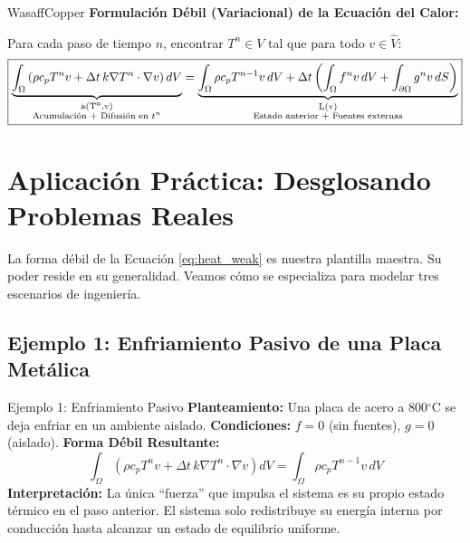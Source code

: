 \documentclass[11pt, a4paper]{article}
\begin{document}
\begin{keybox}{WasaffCopper}
    \textbf{Formulación Débil (Variacional) de la Ecuación del Calor:}
    
    Para cada paso de tiempo $n$, encontrar $T^n \in V$ tal que para todo $v \in \hat{V}$:
    \begin{equation}
        \boxed{
        \underbrace{\int_{\Omega} \left( \rho c_p T^n v + \Delta t \, k \nabla T^n \cdot \nabla v \right) dV}_{\substack{\text{a(T\textsuperscript{n},v)} \\ \text{Acumulación + Difusión en } t^n}} = \underbrace{\int_{\Omega} \rho c_p T^{n-1} v \, dV + \Delta t \left( \int_{\Omega} f^n v \, dV + \int_{\partial \Omega} g^n v \, dS \right)}_{\substack{\text{L(v)} \\ \text{Estado anterior + Fuentes externas}}}
        }
        \label{eq:heat_weak}
    \end{equation}
\end{keybox}

\newpage

\section{Aplicación Práctica: Desglosando Problemas Reales}
La forma débil de la Ecuación \ref{eq:heat_weak} es nuestra plantilla maestra. Su poder reside en su generalidad. Veamos cómo se especializa para modelar tres escenarios de ingeniería.

\subsection{Ejemplo 1: Enfriamiento Pasivo de una Placa Metálica}
\begin{examplebox}{Ejemplo 1: Enfriamiento Pasivo}
    \textbf{Planteamiento:} Una placa de acero a 800$^{\circ}$C se deja enfriar en un ambiente aislado.
    \textbf{Condiciones:} $f = 0$ (sin fuentes), $g = 0$ (aislado).
    \textbf{Forma Débil Resultante:}
    $$ \int_{\Omega} \left( \rho c_p T^n v + \Delta t \, k \nabla T^n \cdot \nabla v \right) dV = \int_{\Omega} \rho c_p T^{n-1} v \, dV $$
    \textbf{Interpretación:} La única ``fuerza'' que impulsa el sistema es su propio estado térmico en el paso anterior. El sistema solo redistribuye su energía interna por conducción hasta alcanzar un estado de equilibrio uniforme.
\end{examplebox}
\end{document}
